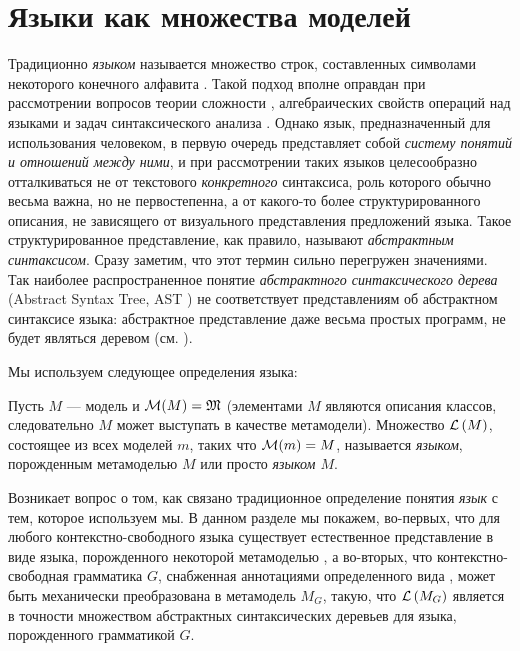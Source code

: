 \chapter{Языки как множества моделей}

Традиционно \emph{языком} называется множество строк, составленных символами некоторого конечного алфавита \cite{DragonBook,MotwaniUlman}. Такой подход вполне оправдан при рассмотрении вопросов теории сложности \cite{AroraBarak}, алгебраических свойств операций над языками \cite{Martynenko,MotwaniUlman} и задач синтаксического анализа \cite{DragonBook}. Однако язык, предназначенный для использования человеком, в первую очередь представляет собой \emph{систему понятий и отношений между ними}, и при рассмотрении таких языков целесообразно отталкиваться не от текстового \emph{конкретного} синтаксиса, роль которого обычно весьма важна, но не первостепенна, а от какого-то более структурированного описания, не зависящего от визуального представления предложений языка. Такое структурированное представление, как правило, называют \emph{абстрактным синтаксисом}. Сразу заметим, что этот термин сильно перегружен значениями. Так наиболее распространенное понятие \emph{абстрактного синтаксического дерева} (Abstract Syntax Tree, AST \cite{SGLR,DragonBook}) не соответствует представлениям об абстрактном синтаксисе языка: абстрактное представление даже весьма простых программ, не будет являться деревом (см. ).

Мы используем следующее определения языка:
\begin{Def}[Язык]
Пусть $M$ --- модель и $\mathcal{M}(M) = \mathfrak{M}$ (элементами $M$ являются описания классов, следовательно $M$ может выступать в качестве метамодели). Множество $\mathcal{L}\left(M\right)$, состоящее из всех моделей $m$, таких что 
	$\mathcal{M}(m) = M$,
называется \emph{языком}, порожденным метамоделью $M$ или просто \emph{языком $M$}.
\end{Def}

Возникает вопрос о том, как связано традиционное определение понятия \emph{язык} с тем, которое используем мы. В данном разделе мы покажем, во-первых, что для любого контекстно-свободного языка существует естественное представление в виде языка, порожденного некоторой метамоделью \cite{Reuseware-something}, а во-вторых, что контекстно-свободная грамматика $G$, снабженная аннотациями определенного вида \cite{xText}, может быть механически преобразована в метамодель $M_G$, такую, что $\mathcal{L}\left(M_G\right)$ является в точности множеством абстрактных синтаксических деревьев для языка, порожденного грамматикой $G$.


